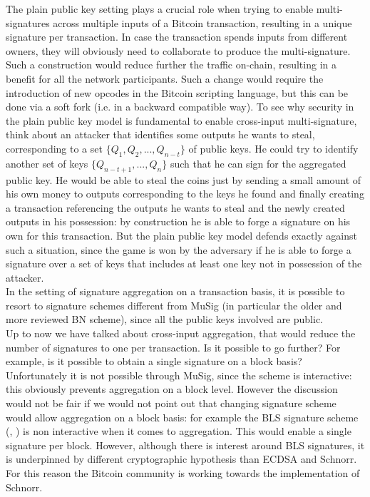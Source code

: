 \bigskip
\noindent
The plain public key setting plays a crucial role when trying to enable multi-signatures across multiple inputs of a Bitcoin transaction, resulting in a unique signature per transaction.  In case the transaction spends inputs from different owners, they will obviously need to collaborate to produce the multi-signature. Such a construction would reduce further the traffic on-chain, resulting in a benefit for all the network participants. Such a change would require the introduction of new opcodes in the Bitcoin scripting language, but this can be done via a soft fork (i.e. in a backward compatible way). To see why security in the plain public key model is fundamental to enable cross-input multi-signature, think about an attacker that identifies some outputs he wants to steal, corresponding to a set $\{Q_1, Q_2, ..., Q_{n - t}\}$ of public keys. He could try to identify another set of keys $\{Q_{n - t + 1}, ..., Q_n\}$ such that he can sign for the aggregated public key. He would be able to steal the coins just by sending a small amount of his own money to outputs corresponding to the keys he found and finally creating a transaction referencing the outputs he wants to steal and the newly created outputs in his possession: by construction he is able to forge a signature on his own for this transaction. But the plain public key model defends exactly against such a situation, since the game is won by the adversary if he is able to forge a signature over a set of keys that includes at least one key not in possession of the attacker. 
\\
In the setting of signature aggregation on a transaction basis, it is possible to resort to signature schemes different from MuSig (in particular the older and more reviewed BN scheme), since all the public keys involved are public.
\\
Up to now we have talked about cross-input aggregation, that would reduce the number of signatures to one per transaction. Is it possible to go further? For example, is it possible to obtain a single signature on a block basis? Unfortunately it is not possible through MuSig, since the scheme is interactive: this obviously prevents aggregation on a block level. However the discussion would not be fair if we would not point out that changing signature scheme would allow aggregation on a block basis: for example the BLS signature scheme (\cite{RefWork:15}, \cite{RefWork:16}) is non interactive when it comes to aggregation. This would enable a single signature per block. However, although there is interest around BLS signatures, it is underpinned by different cryptographic hypothesis than ECDSA and Schnorr. For this reason the Bitcoin community is working towards the implementation of Schnorr.

